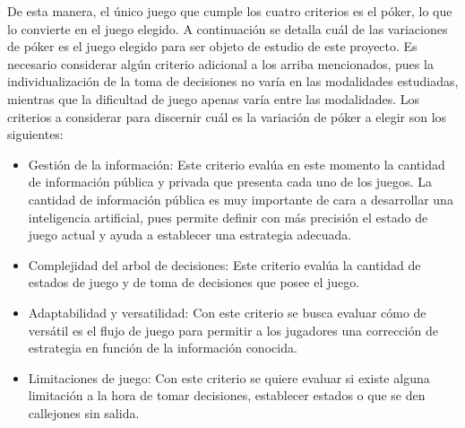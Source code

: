 De esta manera, el único juego que cumple los cuatro criterios es el póker, lo que lo convierte en el juego elegido.
A continuación se detalla cuál de las variaciones de póker es el juego elegido para ser objeto de estudio de este proyecto. Es necesario considerar algún criterio adicional  a los arriba mencionados, pues la individualización de la toma de decisiones no varía en las modalidades estudiadas, mientras que la dificultad de juego apenas varía entre las modalidades.
Los criterios  a considerar para discernir cuál es la variación de póker a elegir son los siguientes:
\begin{itemize}
\item Gestión de la información: Este criterio evalúa en este momento la cantidad de información pública y privada que presenta cada uno de los juegos. La cantidad de información pública es muy importante de cara a desarrollar una inteligencia artificial, pues permite definir con más precisión el estado de juego actual y ayuda a establecer una estrategia adecuada.
\item Complejidad del arbol de decisiones: Este criterio evalúa la cantidad de estados de juego y de toma de decisiones que posee el juego.
\item Adaptabilidad y versatilidad: Con este criterio se busca evaluar cómo de versátil es el flujo de juego para permitir a los jugadores una corrección de estrategia en función de la información conocida.
\item Limitaciones de juego: Con este criterio se quiere evaluar si existe alguna limitación a la hora de tomar decisiones, establecer estados o que se den callejones sin salida.
\end{itemize}


